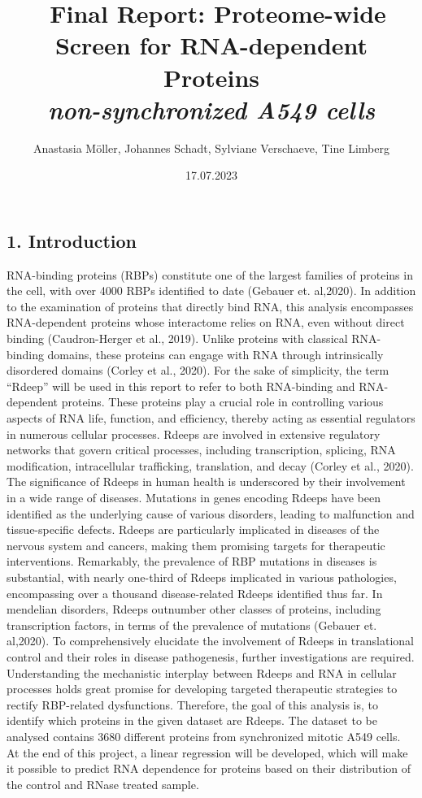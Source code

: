\documentclass[
  12pt,
]{article}
\title{\Huge~\textbf{Final Report:} Proteome-wide Screen for
RNA-dependent Proteins\\
\emph{non-synchronized A549 cells}}
\author{Anastasia Möller, Johannes Schadt, Sylviane Verschaeve, Tine
Limberg}
\date{17.07.2023}
\begin{document}
\maketitle

{
\setcounter{tocdepth}{2}
\tableofcontents
}
\newpage

\hypertarget{introduction}{%
\subsection{1. Introduction}\label{introduction}}

RNA-binding proteins (RBPs) constitute one of the largest families of
proteins in the cell, with over 4000 RBPs identified to date (Gebauer
et. al,2020). In addition to the examination of proteins that directly
bind RNA, this analysis encompasses RNA-dependent proteins whose
interactome relies on RNA, even without direct binding (Caudron-Herger
et al., 2019). Unlike proteins with classical RNA-binding domains, these
proteins can engage with RNA through intrinsically disordered domains
(Corley et al., 2020). For the sake of simplicity, the term ``Rdeep''
will be used in this report to refer to both RNA-binding and
RNA-dependent proteins. These proteins play a crucial role in
controlling various aspects of RNA life, function, and efficiency,
thereby acting as essential regulators in numerous cellular processes.
Rdeeps are involved in extensive regulatory networks that govern
critical processes, including transcription, splicing, RNA modification,
intracellular trafficking, translation, and decay (Corley et al., 2020).
The significance of Rdeeps in human health is underscored by their
involvement in a wide range of diseases. Mutations in genes encoding
Rdeeps have been identified as the underlying cause of various
disorders, leading to malfunction and tissue-specific defects. Rdeeps
are particularly implicated in diseases of the nervous system and
cancers, making them promising targets for therapeutic interventions.
Remarkably, the prevalence of RBP mutations in diseases is substantial,
with nearly one-third of Rdeeps implicated in various pathologies,
encompassing over a thousand disease-related Rdeeps identified thus far.
In mendelian disorders, Rdeeps outnumber other classes of proteins,
including transcription factors, in terms of the prevalence of mutations
(Gebauer et. al,2020). To comprehensively elucidate the involvement of
Rdeeps in translational control and their roles in disease pathogenesis,
further investigations are required. Understanding the mechanistic
interplay between Rdeeps and RNA in cellular processes holds great
promise for developing targeted therapeutic strategies to rectify
RBP-related dysfunctions. Therefore, the goal of this analysis is, to
identify which proteins in the given dataset are Rdeeps. The dataset to
be analysed contains 3680 different proteins from synchronized mitotic
A549 cells. At the end of this project, a linear regression will be
developed, which will make it possible to predict RNA dependence for
proteins based on their distribution of the control and RNase treated
sample.
\end{document}
